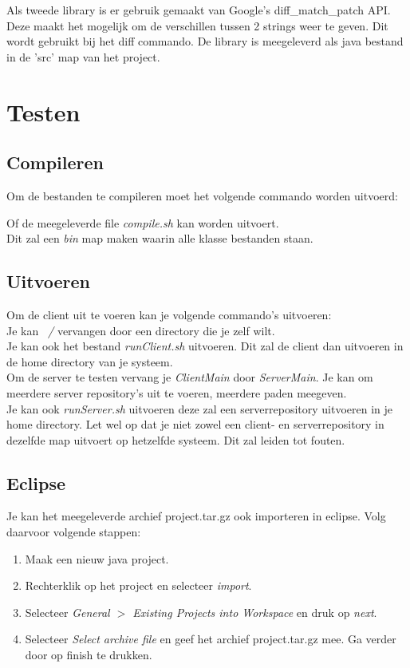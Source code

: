 \documentclass{article}
\begin{document}
Als tweede library is er gebruik gemaakt van Google's diff\_match\_patch API. Deze maakt het mogelijk om de verschillen tussen 2 strings weer te geven. Dit wordt gebruikt bij het diff commando. De library is meegeleverd als java bestand in de 'src' map van het project.

\section{Testen}\label{test}
\subsection{Compileren}
Om de bestanden te compileren moet het volgende commando worden uitvoerd:

Of de meegeleverde file \emph{compile.sh} kan worden uitvoert.\\ Dit zal een \emph{bin} map maken waarin alle klasse bestanden staan. 
\subsection{Uitvoeren}
Om de client uit te voeren kan je volgende commando's uitvoeren:\\

Je kan \emph{~/} vervangen door een directory die je zelf wilt.\\
Je kan ook het bestand \emph{runClient.sh} uitvoeren. Dit zal de client dan uitvoeren in de home directory van je systeem.\\
Om de server te testen vervang je \emph{ClientMain} door \emph{ServerMain}. Je kan om meerdere server repository's uit te voeren, meerdere paden meegeven.\\Je kan ook \emph{runServer.sh} uitvoeren deze zal een serverrepository uitvoeren in je home directory. Let wel op dat je niet zowel een client- en serverrepository in dezelfde map uitvoert op hetzelfde systeem. Dit zal leiden tot fouten.

\subsection{Eclipse}
\label{sub:eclipse}
Je kan het meegeleverde archief project.tar.gz ook importeren in eclipse. Volg daarvoor volgende stappen:
\begin{enumerate}
	\item Maak een nieuw java project.
	\item Rechterklik op het project en selecteer \emph{import}.
	\item Selecteer \emph{General $>$ Existing Projects into Workspace} en druk op \emph{next}.
	\item Selecteer \emph{Select archive file} en geef het archief project.tar.gz mee. Ga verder door op finish te drukken.
\end{enumerate}
\end{document}
